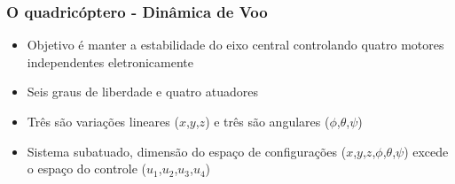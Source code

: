\documentclass{beamer}
\begin{document}
\begin{frame}[allowframebreaks]
	
	\frametitle{O quadricóptero - Dinâmica de Voo}
	
	\begin{itemize}
		
		\item Objetivo é manter a estabilidade do eixo central controlando quatro motores independentes eletronicamente
		
		\item Seis graus de liberdade e quatro atuadores
				
		\item Três são variações lineares ($x$,$y$,$z$) e três são angulares ($\phi$,$\theta$,$\psi$)
						
		\item  Sistema subatuado, dimensão do espaço de configurações ($x$,$y$,$z$,$\phi$,$\theta$,$\psi$) excede o espaço do controle ($u_1$,$u_2$,$u_3$,$u_4$) 
				
		
		
%		
%		
%		
%		
%	
%		
%		
%	
%	
%		
	
	\end{itemize}	
	
\end{frame}	 
\end{document}
